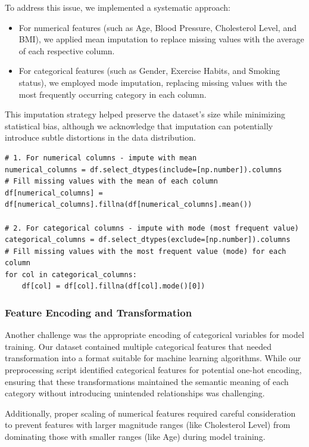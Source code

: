 \documentclass[11pt,a4paper]{article}
\begin{document}
To address this issue, we implemented a systematic approach:
\vspace{-0.25cm}
\begin{itemize}
    \item For numerical features (such as Age, Blood Pressure, Cholesterol Level, and BMI), we applied mean imputation to replace missing values with the average of each respective column.
    \item For categorical features (such as Gender, Exercise Habits, and Smoking status), we employed mode imputation, replacing missing values with the most frequently occurring category in each column.
\end{itemize}

This imputation strategy helped preserve the dataset's size while minimizing statistical bias, although we acknowledge that imputation can potentially introduce subtle distortions in the data distribution.

\begin{lstlisting}
# 1. For numerical columns - impute with mean
numerical_columns = df.select_dtypes(include=[np.number]).columns
# Fill missing values with the mean of each column
df[numerical_columns] = df[numerical_columns].fillna(df[numerical_columns].mean())

# 2. For categorical columns - impute with mode (most frequent value)
categorical_columns = df.select_dtypes(exclude=[np.number]).columns
# Fill missing values with the most frequent value (mode) for each column
for col in categorical_columns:
    df[col] = df[col].fillna(df[col].mode()[0])
\end{lstlisting}

\subsubsection{Feature Encoding and Transformation}
\vspace{-0.25cm}
Another challenge was the appropriate encoding of categorical variables for model training. Our dataset contained multiple categorical features that needed transformation into a format suitable for machine learning algorithms. While our preprocessing script identified categorical features for potential one-hot encoding, ensuring that these transformations maintained the semantic meaning of each category without introducing unintended relationships was challenging.

Additionally, proper scaling of numerical features required careful consideration to prevent features with larger magnitude ranges (like Cholesterol Level) from dominating those with smaller ranges (like Age) during model training.
\end{document}
